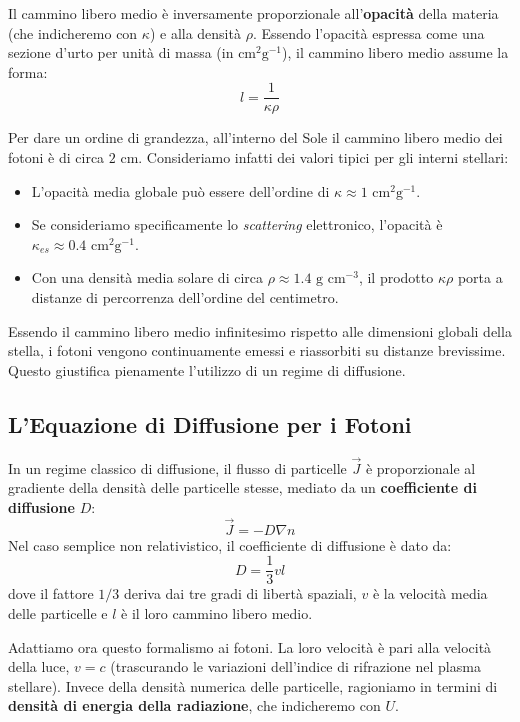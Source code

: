 Il cammino libero medio è inversamente proporzionale all'\textbf{opacità} della materia (che indicheremo con $\kappa$) e alla densità $\rho$. Essendo l'opacità espressa come una sezione d'urto per unità di massa (in $\text{cm}^2 \text{g}^{-1}$), il cammino libero medio assume la forma:
\begin{equation}
l = \frac{1}{\kappa \rho}
\end{equation}

Per dare un ordine di grandezza, all'interno del Sole il cammino libero medio dei fotoni è di circa $2 \text{ cm}$. Consideriamo infatti dei valori tipici per gli interni stellari:
\begin{itemize}
\item L'opacità media globale può essere dell'ordine di $\kappa \approx 1 \text{ cm}^2 \text{g}^{-1}$.
\item Se consideriamo specificamente lo \textit{scattering} elettronico, l'opacità è $\kappa_{es} \approx 0.4 \text{ cm}^2 \text{g}^{-1}$.
\item Con una densità media solare di circa $\rho \approx 1.4 \text{ g cm}^{-3}$, il prodotto $\kappa \rho$ porta a distanze di percorrenza dell'ordine del centimetro.
\end{itemize}
Essendo il cammino libero medio infinitesimo rispetto alle dimensioni globali della stella, i fotoni vengono continuamente emessi e riassorbiti su distanze brevissime. Questo giustifica pienamente l'utilizzo di un regime di diffusione.

\subsection{L'Equazione di Diffusione per i Fotoni}

In un regime classico di diffusione, il flusso di particelle $\vec{J}$ è proporzionale al gradiente della densità delle particelle stesse, mediato da un \textbf{coefficiente di diffusione} $D$:
\begin{equation}
\vec{J} = - D \nabla n
\end{equation}
Nel caso semplice non relativistico, il coefficiente di diffusione è dato da:
\begin{equation}
D = \frac{1}{3} v l
\end{equation}
dove il fattore $1/3$ deriva dai tre gradi di libertà spaziali, $v$ è la velocità media delle particelle e $l$ è il loro cammino libero medio.

Adattiamo ora questo formalismo ai fotoni. La loro velocità è pari alla velocità della luce, $v = c$ (trascurando le variazioni dell'indice di rifrazione nel plasma stellare). Invece della densità numerica delle particelle, ragioniamo in termini di \textbf{densità di energia della radiazione}, che indicheremo con $U$.

